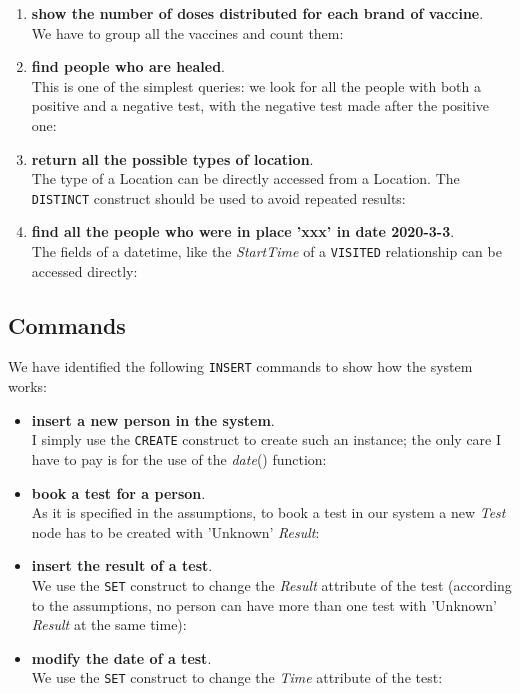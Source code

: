 \documentclass{article}
\begin{document}
\begin{enumerate}
    
    \item \textbf{show the number of doses distributed for each brand of vaccine}.\\ We have to group all the vaccines and count them:
    
    \item \textbf{find people who are healed}. \\This is one of the simplest queries: we look for all the people with both a positive and a negative test, with the negative test made after the positive one:
    
    \item \textbf{return all the possible types of location}. \\The type of a Location can be directly accessed from a Location. The \verb|DISTINCT| construct should be used to avoid repeated results:
    
    \item \textbf{find all the people who were in place 'xxx' in date 2020-3-3}. \\The fields of a datetime, like the \textit{StartTime} of a \verb|VISITED| relationship can be accessed directly:
    
\end{enumerate}
\subsection{Commands}
We have identified the following \verb |INSERT| commands to show how the system works:
\begin{itemize}
    \item \textbf{insert a new person in the system}. \\I simply use the \verb|CREATE| construct to create such an instance; the only care I have to pay is for the use of the \textit{date}() function:
    
    \item \textbf{book a test for a person}.\\As it is specified in the assumptions, to book a test in our system a new \textit{Test} node has to be created with 'Unknown' \textit{Result}:
    
    \item \textbf{insert the result of a test}. \\We use the \verb|SET| construct to change the \textit{Result} attribute of the test (according to the assumptions, no person can have more than one test with 'Unknown' \textit{Result} at the same time):
    
    \item \textbf{modify the date of a test}. \\We use the \verb|SET| construct to change the \textit{Time} attribute of the test:
    
\end{itemize}
\end{document}
